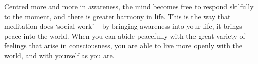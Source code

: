 Centred more and more in awareness, the mind becomes free to respond
skilfully to the moment, and there is greater harmony in life. This is
the way that meditation does `social work' -- by bringing awareness into
your life, it brings peace into the world. When you can abide peacefully
with the great variety of feelings that arise in consciousness, you are
able to live more openly with the world, and with yourself as you are.

